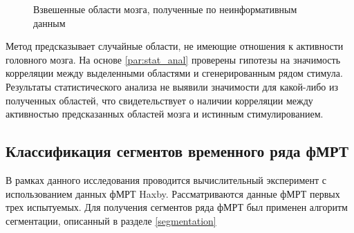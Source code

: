 \begin{figure}[h!]
	\centering
	\hfill
	\hfill
 \caption{Взвешенные области мозга, полученные по неинформативным данным}
\label{fig:correctness}
\end{figure}
Метод предсказывает случайные области, не имеющие отношения к активности головного мозга. 
На основе \ref{par:stat_anal} проверены гипотезы на значимость корреляции между выделенными областями и сгенерированным рядом стимула. Результаты статистического анализа не выявили значимости для какой-либо из полученных областей, что свидетельствует о наличии корреляции между активностью предсказанных областей мозга и истинным стимулированием.
\subsection{Классификация сегментов временного ряда фМРТ}
В рамках данного исследования проводится вычислительный эксперимент с использованием данных фМРТ Haxby. Рассматриваются данные фМРТ первых трех испытуемых. Для получения сегментов ряда фМРТ был применен алгоритм сегментации, описанный в разделе \ref{segmentation}

